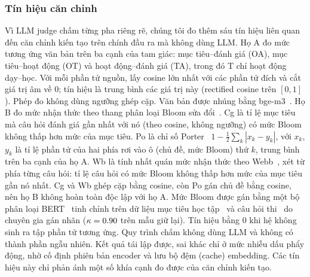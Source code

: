 \documentclass[conference,a4paper]{IEEEtran}
\begin{document}
\subsubsection{Tín hiệu căn chỉnh}
Vì LLM judge chấm từng pha riêng rẽ, chúng tôi đo thêm sáu tín hiệu liên quan đến
căn chỉnh kiến tạo trên chính đầu ra mà không dùng LLM. Họ A đo mức tương ứng văn
bản trên ba cạnh của tam giác: mục tiêu--đánh giá (OA), mục tiêu--hoạt động (OT)
và hoạt động--đánh giá (TA), trong đó T chỉ hoạt động dạy--học. Với mỗi phần tử nguồn, lấy cosine lớn nhất với các phần tử đích và cắt giá trị âm về 0; tín hiệu là trung bình các giá trị này (rectified cosine trên $[0,1]$). Phép đo không dùng ngưỡng ghép cặp. Văn bản được nhúng
bằng bge-m3~\cite{chen2024m3embedding}. Họ B đo mức nhận thức theo thang phân loại Bloom sửa
đổi~\cite{anderson2001taxonomy}. Cg là tỉ lệ mục tiêu mà câu hỏi đánh giá gần nhất
với nó (theo cosine, không ngưỡng) có mức Bloom không thấp hơn mức của mục tiêu.
Po là chỉ số Porter~\cite{porter2002measuring} $1-\tfrac12\sum_k|x_k-y_k|$, với $x_k$, $y_k$ là
tỉ lệ phần tử của hai phía rơi vào ô (chủ đề, mức Bloom) thứ $k$, trung bình trên ba cạnh của họ A. Wb là tính nhất quán mức nhận thức theo Webb~\cite{webb1997criteria}, xét từ phía từng câu hỏi: tỉ lệ câu hỏi có mức Bloom không thấp hơn mức của mục tiêu gần nó nhất. Cg và Wb ghép cặp bằng cosine, còn Po gán chủ đề bằng cosine, nên họ B không hoàn toàn độc lập với họ A. Mức Bloom được gán bằng một bộ phân loại BERT~\cite{devlin2019bert} tinh
chỉnh trên dữ liệu mục tiêu học tập~\cite{li2022bloomclassification} và câu hỏi thi~\cite{faraji2026crossdataset} do chuyên gia gán nhãn ($\kappa=0.90$ trên \BloomN{} mẫu giữ lại). Tín
hiệu bằng 0 khi hệ không sinh ra tập phần tử tương ứng. Quy trình chấm không dùng
LLM và không có thành phần ngẫu nhiên. Kết quả tái lập được, sai khác chỉ ở mức
nhiễu dấu phẩy động, nhờ cố định phiên bản encoder và lưu bộ đệm (cache) embedding. Các tín hiệu này chỉ phản ánh một số khía cạnh đo được của căn chỉnh kiến tạo.
\end{document}
